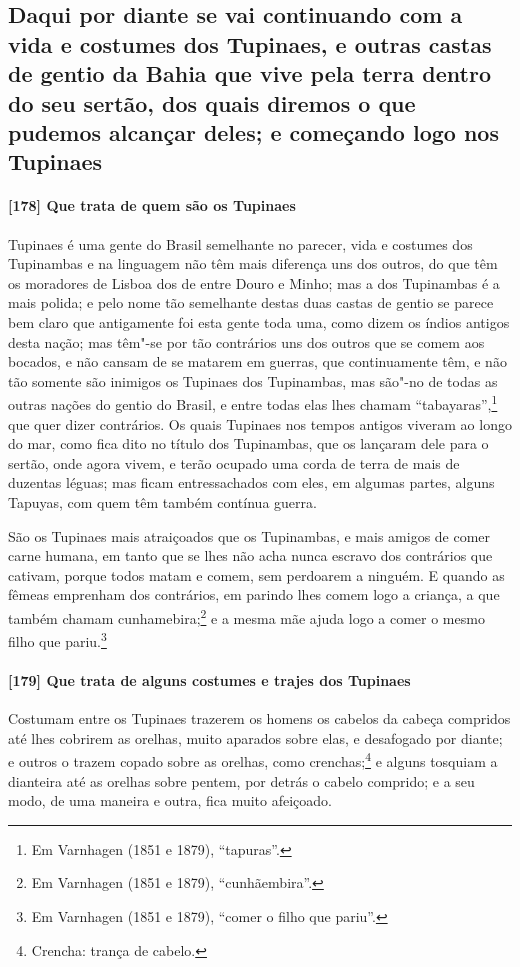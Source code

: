 \subsection{Daqui por diante se vai continuando com a vida e costumes dos Tupinaes, e
outras castas de gentio da Bahia que vive pela terra dentro do seu sertão, dos quais
diremos o que pudemos alcançar deles; e começando logo nos Tupinaes}

\paragraph{[178] Que trata de quem são os Tupinaes}\quad
Tupinaes é uma gente do Brasil semelhante no parecer, vida e costumes dos Tupinambas e na
linguagem não têm mais diferença uns dos outros, do que têm os moradores de Lisboa dos
de entre Douro e Minho; mas a dos Tupinambas é a mais polida; e pelo nome tão semelhante
destas duas castas de gentio se parece bem claro que antigamente foi esta gente toda uma,
como dizem os índios antigos desta nação; mas têm"-se por tão contrários uns dos outros que
se comem aos bocados, e não cansam de se matarem em guerras, que continuamente têm, e não
tão somente são inimigos os Tupinaes dos Tupinambas, mas são"-no de todas as outras nações
do gentio do Brasil, e entre todas elas lhes chamam ``tabayaras'',\footnote{ Em Varnhagen
(1851 e 1879), ``tapuras''.} que quer dizer contrários. Os quais Tupinaes nos tempos
antigos viveram ao longo do mar, como fica dito no título dos Tupinambas, que os lançaram
dele para o sertão, onde agora vivem, e terão ocupado uma corda de terra de mais de
duzentas léguas; mas ficam entressachados com eles, em algumas partes, alguns Tapuyas, com
quem têm também contínua guerra.

São os Tupinaes mais atraiçoados que os Tupinambas, e mais amigos de comer carne humana,
em tanto que se lhes não acha nunca escravo dos contrários que cativam, porque todos matam
e comem, sem perdoarem a ninguém. E quando as fêmeas emprenham dos contrários, em parindo
lhes comem logo a criança, a que também chamam cunhamebira;\footnote{ Em Varnhagen (1851 e
1879), ``cunhãembira''.} e a mesma mãe ajuda logo a comer o mesmo filho que
pariu.\footnote{ Em Varnhagen (1851 e 1879), ``comer o filho que pariu''.}

\paragraph{[179] Que trata de alguns costumes e trajes dos Tupinaes}\quad
\mbox{Costumam} entre os Tupinaes trazerem os homens os cabelos da cabeça compridos até lhes
cobrirem as orelhas, muito aparados sobre elas, e desafogado por diante; e outros o trazem
copado sobre as orelhas, como crenchas;\footnote{ Crencha: trança de cabelo.} e alguns
tosquiam a dianteira até as orelhas sobre pentem, por detrás o cabelo comprido; e a seu
modo, de uma maneira e outra, fica muito afeiçoado.

